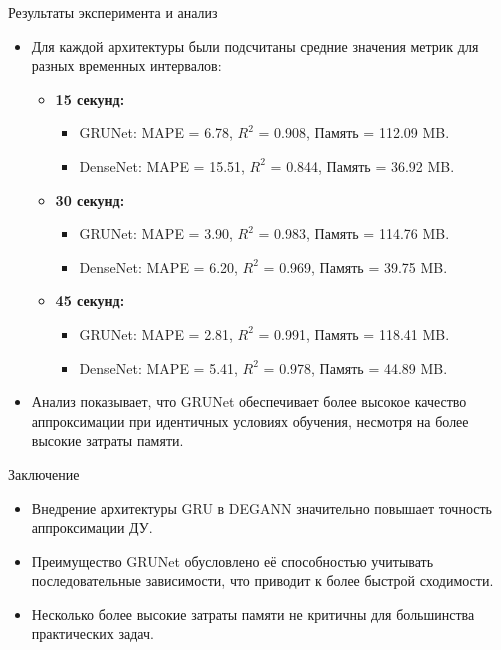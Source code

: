 \documentclass
  [ russian
  , aspectratio=1610 %
  ] {beamer}
\begin{document}
\begin{frame}{Результаты эксперимента и анализ}
    \begin{itemize}
        \item Для каждой архитектуры были подсчитаны средние значения метрик для разных временных интервалов:
              \begin{itemize}
                  \item \textbf{15 секунд:}
                        \begin{itemize}
                            \item GRUNet: MAPE = 6.78, \(R^2\) = 0.908, Память = 112.09 MB.
                            \item DenseNet: MAPE = 15.51, \(R^2\) = 0.844, Память = 36.92 MB.
                        \end{itemize}
                  \item \textbf{30 секунд:}
                        \begin{itemize}
                            \item GRUNet: MAPE = 3.90, \(R^2\) = 0.983, Память = 114.76 MB.
                            \item DenseNet: MAPE = 6.20, \(R^2\) = 0.969, Память = 39.75 MB.
                        \end{itemize}
                  \item \textbf{45 секунд:}
                        \begin{itemize}
                            \item GRUNet: MAPE = 2.81, \(R^2\) = 0.991, Память = 118.41 MB.
                            \item DenseNet: MAPE = 5.41, \(R^2\) = 0.978, Память = 44.89 MB.
                        \end{itemize}
              \end{itemize}
        \item Анализ показывает, что GRUNet обеспечивает более высокое качество аппроксимации при идентичных условиях обучения, несмотря на более высокие затраты памяти.
    \end{itemize}
\end{frame}

\begin{frame}{Заключение}
    \begin{itemize}
        \item Внедрение архитектуры GRU в DEGANN значительно повышает точность аппроксимации ДУ.
        \item Преимущество GRUNet обусловлено её способностью учитывать последовательные зависимости, что приводит к более быстрой сходимости.
        \item Несколько более высокие затраты памяти не критичны для большинства практических задач.
    \end{itemize}
\end{frame}
\end{document}
